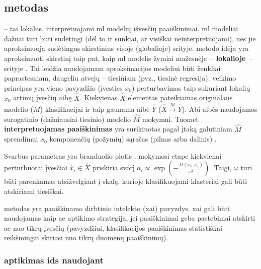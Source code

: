 \subsection{\LIME metodas}

\LIME {} -- tai lokalūs, interpretuojami \gls{ml} modelių išvesčių paaiškinimai. \gls{ml} modeliai dažnai turi būti sudėtingi (dėl to ir sunkiai, ar visiškai neinterpretuojami), nes jie aproksimuoja sudėtingus skirstinius visoje (globalioje) srityje. \LIME metodo idėja yra aproksimuoti skirstinį taip pat, kaip \gls{ml} modelis žymiai mažesnėje --~\textbf{lokalioje}~-- srityje . Tai leidžia \LIME naudojamam aproksimacijos modeliui būti ženkliai paprastesniam, daugeliu atvejų -- tiesiniam (pvz., tiesinė regresija).
\LIME veikimo principas yra vieno pavyzdžio (įvesties $x_0$) perturbavimas taip sukuriant lokalių $x_0$ artimų įvesčių aibę $\hat{X}$. Kiekvienas $\hat{X}$ elementas pateikiamas originalaus modelio ($M$) klasifikacijai ir taip gaunama aibė $\hat{Y}$ ($\hat{X} \xrightarrow{M} \hat{Y}$). Abi aibės naudojamos surogatinio (dažniausiai tiesinio) modelio $\hat{M}$ mokymui. Tuomet \textbf{interpretuojamas paaiškinimas} yra surikiuotas pagal įtaką galutiniam $\hat{M}$ sprendimui $x_0$ komponenčių (požymių) sąrašas (pilnas arba dalinis) \cite{ribeiroWhyShouldTrust2016}.

Svarbus \LIME parametras yra branduolio plotis  \omega. \LIME mokymosi etape kiekvienai perturbuotai įvesčiai $\hat{x}_i \in \hat{X}$ priskiria svorį $a_i \propto \exp\left(-\frac{D(x_0, \hat{x}_i)}{\omega^2}\right)$. Taigi, $\omega$ turi būti parenkamas atsižvelgiant į skalę, kurioje klasifikuojami klasteriai gali būti atskiriami tiesiškai.

\LIME metodas yra paaiškinamo dirbtinio intelekto (\gls{xai}) pavyzdys. \gls{xai} gali būti naudojamas kaip \gls{ae} aptikimo strategija, jei paaiškinimai geba pastebimai atskirti \gls{ae} nuo tikrų įvesčių (pavyzdžiui, klasifikacijos paaiškinimas statistiškai reikšmingai skiriasi nuo tikrų duomenų paaiškinimų).

\subsubsection{ aptikimas \gls{ids} naudojant \LIME}

